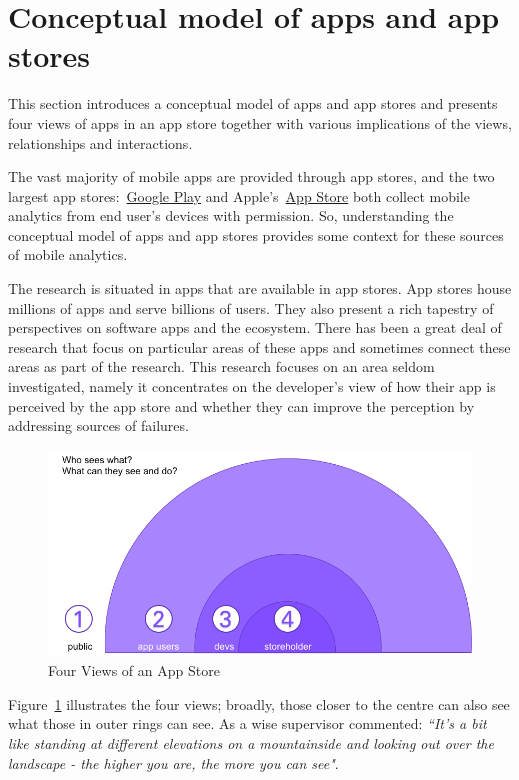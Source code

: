 \section{Conceptual model of apps and app stores}
This section introduces a conceptual model of apps and app stores and presents four views of apps in an app store together with various implications of the views, relationships and interactions. 

The vast majority of mobile apps are provided through app stores, and the two largest app stores:~\href{https://play.google.com/store/apps}{Google Play} and Apple's~\href{https://www.apple.com/app-store/}{App Store} both collect mobile analytics from end user's devices with permission. So, understanding the conceptual model of apps and app stores provides some context for these sources of mobile analytics. 

The research is situated in apps that are available in app stores. App stores house millions of apps and serve billions of users. They also present a rich tapestry of perspectives on software apps and the ecosystem. There has been a great deal of research that focus on particular areas of these apps and sometimes connect these areas as part of the research. This research focuses on an area seldom investigated, namely it concentrates on the developer's view of how their app is perceived by the app store and whether they can improve the perception by addressing sources of failures.

\begin{figure}[htbp!]
    \centering
    \includegraphics[width=12cm]{images/who-sees-what.png}
    \caption{Four Views of an App Store}
    \label{fig:4-views-of-apps-in-app-store}
\end{figure}

Figure~\ref{fig:4-views-of-apps-in-app-store} illustrates the four views; broadly, those closer to the centre can also see what those in outer rings can see. As a wise supervisor commented: \emph{``It's a bit like standing at different elevations on a mountainside and looking out over the landscape - the higher you are, the more you can see"}.

